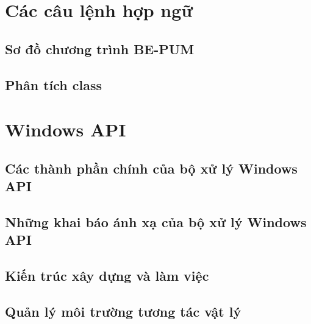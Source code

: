 \section{Các câu lệnh hợp ngữ}
	\subsection{Sơ đồ chương trình BE-PUM}
	\subsection{Phân tích class}
	
\section{Windows API}

\subsection{Các thành phần chính của bộ xử lý Windows API}

\subsection{Những khai báo ánh xạ của bộ xử lý Windows API}

\subsection{Kiến trúc xây dựng và làm việc}

\subsection{Quản lý môi trường tương tác vật lý}